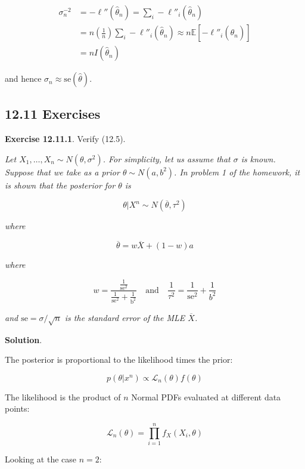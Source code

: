 \begin{align}
\sigma_n^{-2} &= -\ell''(\hat{\theta}_n) = \sum_i -\ell''_i(\hat{\theta}_n) \\
&= n \left( \frac{1}{n} \right) \sum_i -\ell''_i(\hat{\theta}_n) \approx n \mathbb{E}\left[-\ell''_i(\hat{\theta}_n)\right] \\
&= n I(\hat{\theta}_n)
\end{align}

and hence \(\sigma_n \approx \text{se}(\hat{\theta})\).

\subsection{12.11 Exercises}\label{exercises}

\textbf{Exercise 12.11.1}. Verify (12.5).

\emph{Let \(X_1, \dots, X_n \sim N(\theta, \sigma^2)\). For simplicity,
let us assume that \(\sigma\) is known. Suppose that we take as a prior
\(\theta \sim N(a, b^2)\). In problem 1 of the homework, it is shown
that the posterior for \(\theta\) is}

\[\theta | X^n \sim N(\overline{\theta}, \tau^2)\]

\emph{where}

\[\overline{\theta} = w \overline{X} + (1 - w) a\]

\emph{where}

\[w = \frac{\frac{1}{\text{se}^2}}{\frac{1}{\text{se}^2} + \frac{1}{\text{b}^2}} \quad \text{and} \quad \frac{1}{\tau^2} = \frac{1}{\text{se}^2} + \frac{1}{b^2}\]

\emph{and \(\text{se} = \sigma / \sqrt{n}\) is the standard error of the
MLE \(\overline{X}\).}

\textbf{Solution}.

The posterior is proportional to the likelihood times the prior:

\[ p(\theta | x^n) \propto \mathcal{L}_n(\theta) f(\theta)\]

The likelihood is the product of \(n\) Normal PDFs evaluated at
different data points:

\[ 
\mathcal{L}_n(\theta) = \prod_{i=1}^n f_X(X_i, \theta)
\]

Looking at the case \(n = 2\):

